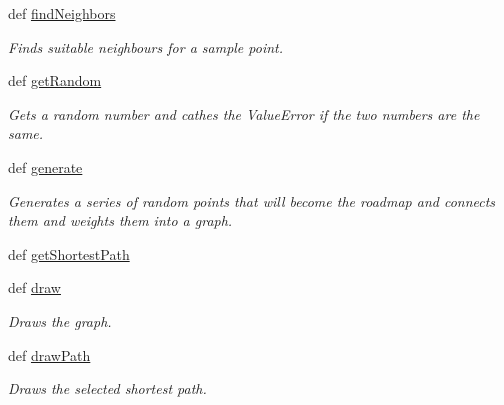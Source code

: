 \begin{DoxyCompactItemize}
def \hyperlink{classprm_1_1PRMGenerator_a2acf210887cb331b20c5378da634b4eb}{find\-Neighbors}
\begin{DoxyCompactList}\small\item\em Finds suitable neighbours for a sample point. \end{DoxyCompactList}\item 
def \hyperlink{classprm_1_1PRMGenerator_acefd405f735018b6399df96c7025e7fe}{get\-Random}
\begin{DoxyCompactList}\small\item\em Gets a random number and cathes the Value\-Error if the two numbers are the same. \end{DoxyCompactList}\item 
def \hyperlink{classprm_1_1PRMGenerator_aabedd114ea5948bb92f477be30b41619}{generate}
\begin{DoxyCompactList}\small\item\em Generates a series of random points that will become the roadmap and connects them and weights them into a graph. \end{DoxyCompactList}\item 
def \hyperlink{classprm_1_1PRMGenerator_a68f56f84f2ce43001c1f80a8d5300812}{get\-Shortest\-Path}
\item 
def \hyperlink{classprm_1_1PRMGenerator_a2673d3d75416b4376244a24bf2504435}{draw}
\begin{DoxyCompactList}\small\item\em Draws the graph. \end{DoxyCompactList}\item 
def \hyperlink{classprm_1_1PRMGenerator_ab001351e371b3d9963b08bc91b5ddab9}{draw\-Path}
\begin{DoxyCompactList}\small\item\em Draws the selected shortest path. \end{DoxyCompactList}\end{DoxyCompactItemize}
